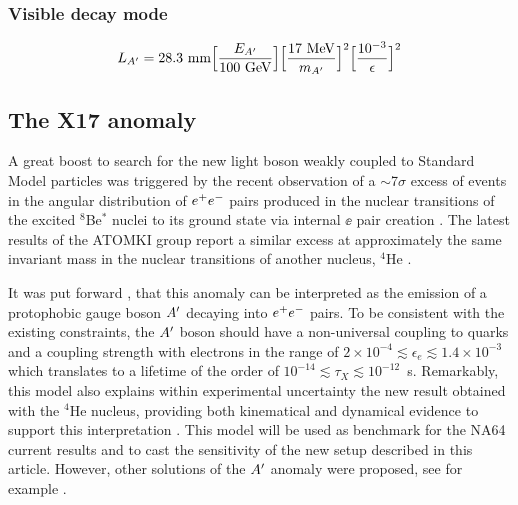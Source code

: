 \subsubsection{Visible decay mode}
\label{ch1:sec:dm-decay-vis}


\begin{eqnarray}
  L_{A'} = 28.3 ~{\rm mm}  \Bigl[\frac{E_{A'}}{100~ {\rm GeV}}\Bigr] 
  \Bigl[\frac{17~ {\rm MeV}}{m_{A'}}\Bigr]^2 \Bigl[\frac{10^{-3}}{\epsilon}\Bigr]^2
  \label{eq:dm-decay-length}
\end{eqnarray}

\subsection{The X17 anomaly}
\label{ch1:sec:dm-u1model-motivations-x17}

A great boost to search for the new light boson weakly coupled to Standard Model particles was triggered by the recent observation of a $\sim$7$\sigma$ excess of events in the angular distribution of $e^+e^-$ pairs produced in the nuclear transitions of the excited $^8$Be$^*$ nuclei to its ground state via internal $\ee$ pair creation \cite{Krasznahorkay:2015iga}. The latest results of the ATOMKI group report a similar excess at approximately the same invariant mass in the nuclear transitions of another nucleus, $^4$He \cite{Krasznahorkay:2019lyl}.

It was put forward  \cite{Feng:2016jff,PhysRevD.95.035017}, that this anomaly can be interpreted as the emission of a protophobic gauge boson $A'$ decaying into $e^+e^-$ pairs. To be consistent with the existing constraints, the $A'$ boson should have a non-universal coupling to quarks and a coupling strength with electrons in the range of $2\times 10^{-4} \lesssim \epsilon_e \lesssim 1.4\times 10^{-3}$ which translates to a lifetime of the order of $10^{-14}\lesssim \tau_X \lesssim 10^{-12}$~s. Remarkably, this model also explains within experimental uncertainty the new result obtained with the $^4$He nucleus, providing both kinematical and dynamical evidence to support this interpretation \cite{Feng:2020mbt}. This model will be used as benchmark for the NA64 current results and to cast the sensitivity of the new setup described in this article. However, other solutions of the $A'$ anomaly were proposed, see for example \cite{Nam:2019osu, Seto:2016pks}.

